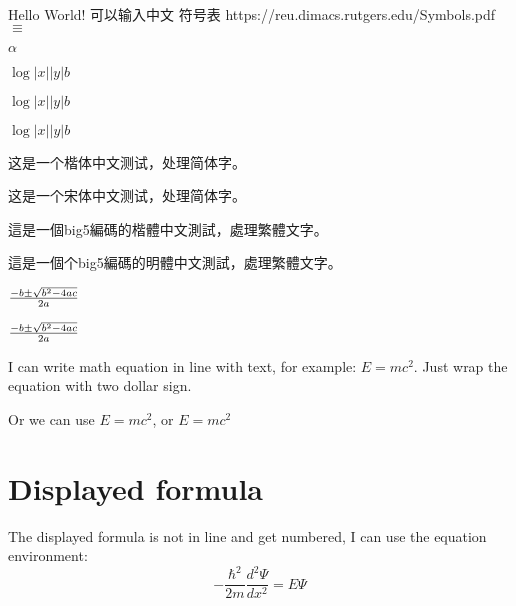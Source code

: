 \documentclass{article}
\begin{document}
\begin{CJK}{UTF8}{gbsn}
  Hello World!
  可以输入中文
  符号表  https://reu.dimacs.rutgers.edu/Symbols.pdf
  $\equiv$

  $\alpha$

  $  \log|x||y|b $

  $  \log\left|x\right|\left|y\right|b $

  $  \log\mathopen|x\mathclose|\mathopen|y\mathclose|b $
\end{CJK}


\begin{CJK}{UTF8}{gkai}  
这是一个楷体中文测试，处理简体字。  
\end{CJK}  
\begin{CJK}{UTF8}{gbsn}  
这是一个宋体中文测试，处理简体字。  
\end{CJK}  
\begin{CJK}{UTF8}{bkai}  
這是一個big5編碼的楷體中文測試，處理繁體文字。  
\end{CJK}  
\begin{CJK}{UTF8}{bsmi}  
這是一個个big5編碼的明體中文測試，處理繁體文字。  
\end{CJK}  

${-b\pm\sqrt{b^2-4ac} \over {2a}}$

\({-b\pm\sqrt{b^2-4ac} \over {2a}}\)


I can write math equation in line with text, for example: $E=mc^2$. Just wrap the equation with two dollar sign.

Or we can use \(E=mc^2\), or \begin{math}E=mc^2\end{math}       %

\section{Displayed formula}
The displayed formula is not in line and get numbered, I can use the equation environment:      %
\begin{equation}
-\frac{\hbar^2}{2m}\frac{d^2\Psi}{dx^2}=E\Psi       %
\end{equation}
\end{document}
